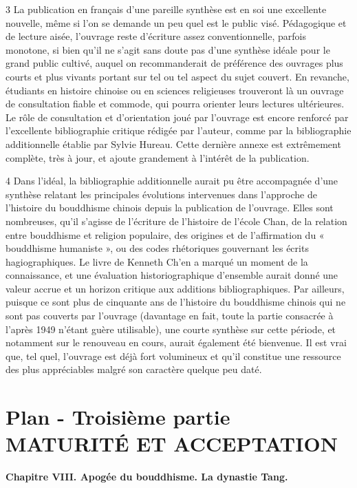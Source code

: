 3 La publication en français d’une pareille synthèse est en soi une excellente nouvelle, même si l’on se demande un peu quel est le public visé. Pédagogique et de lecture aisée, l’ouvrage reste d’écriture assez conventionnelle, parfois monotone, si bien qu’il ne s’agit sans doute pas d’une synthèse idéale pour le grand public cultivé, auquel on recommanderait de préférence des ouvrages plus courts et plus vivants portant sur tel ou tel aspect du sujet couvert. En revanche, étudiants en histoire chinoise ou en sciences religieuses trouveront là un ouvrage de consultation fiable et commode, qui pourra orienter leurs lectures ultérieures. Le rôle de consultation et d’orientation joué par l’ouvrage est encore renforcé par l’excellente bibliographie critique rédigée par l’auteur, comme par la bibliographie additionnelle établie par Sylvie Hureau. Cette dernière annexe est extrêmement complète, très à jour, et ajoute grandement à l’intérêt de la publication.

4 Dans l’idéal, la bibliographie additionnelle aurait pu être accompagnée d’une synthèse relatant les principales évolutions intervenues dans l’approche de l’histoire du bouddhisme chinois depuis la publication de l’ouvrage. Elles sont nombreuses, qu’il s’agisse de l’écriture de l’histoire de l’école Chan, de la relation entre bouddhisme et religion populaire, des origines et de l’affirmation du « bouddhisme humaniste », ou des codes rhétoriques gouvernant les écrits hagiographiques. Le livre de Kenneth Ch’en a marqué un moment de la connaissance, et une évaluation historiographique d’ensemble aurait donné une valeur accrue et un horizon critique aux additions bibliographiques. Par ailleurs, puisque ce sont plus de cinquante ans de l’histoire du bouddhisme chinois qui ne sont pas couverts par l’ouvrage (davantage en fait, toute la partie consacrée à l’après 1949 n’étant guère utilisable), une courte synthèse sur cette période, et notamment sur le renouveau en cours, aurait également été bienvenue. Il est vrai que, tel quel, l’ouvrage est déjà fort volumineux et qu’il constitue une ressource des plus appréciables malgré son caractère quelque peu daté.

\section{Plan - Troisième partie
MATURITÉ ET ACCEPTATION}


\textbf{Chapitre VIII. Apogée du bouddhisme. La dynastie Tang.}

